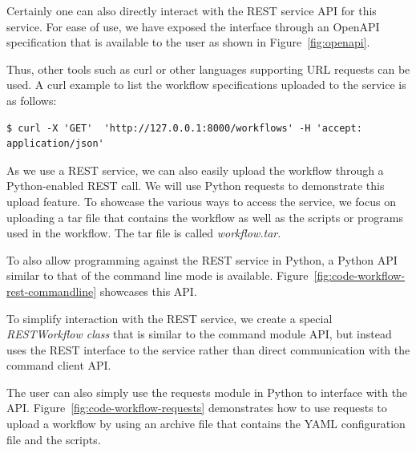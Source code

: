 Certainly one can also directly interact with the REST service API for
this service. For ease of use, we have exposed the interface through
an OpenAPI specification that is available to the user as shown in
Figure~\ref{fig:openapi}.

Thus, other tools such as curl or other languages supporting URL
requests can be used. A curl example to list the workflow
specifications uploaded to the service is as follows:

\begin{verbatim}
$ curl -X 'GET'  'http://127.0.0.1:8000/workflows' -H 'accept: application/json'
\end{verbatim}

As we use a REST service, we can also easily upload the workflow
through a Python-enabled REST call. We will use Python requests to
demonstrate this upload feature. To showcase the various ways to
access the service, we focus on uploading a tar file that contains the
workflow as well as the scripts or programs used in the workflow. The
tar file is called {\em workflow.tar}.

To also allow programming against the REST service in Python, a Python
API similar to that of the command line mode is
available. Figure~\ref{fig:code-workflow-rest-commandline} showcases
this API.

To simplify interaction with the REST service, we create a special
{\em RESTWorkflow class} that is similar to the command module API,
but instead uses the REST interface to the service rather than direct
communication with the command client API.

The user can also simply use the requests module in Python to
interface with the API. Figure~\ref{fig:code-workflow-requests}
demonstrates how to use requests to upload a workflow by using an
archive file that contains the YAML configuration file and the
scripts.

